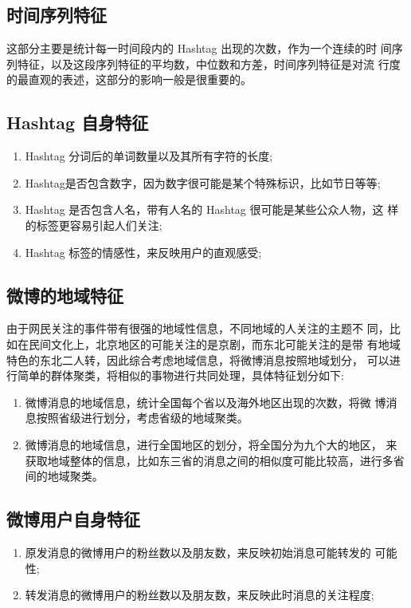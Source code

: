 \subsection{时间序列特征}

这部分主要是统计每一时间段内的 Hashtag 出现的次数，作为一个连续的时 间序列特征，以及这段序列特征的平均数，中位数和方差，时间序列特征是对流 行度的最直观的表述，这部分的影响一般是很重要的。

\subsection{Hashtag 自身特征}

\begin{enumerate}
\item Hashtag 分词后的单词数量以及其所有字符的长度;
\item Hashtag是否包含数字，因为数字很可能是某个特殊标识，比如节日等等; 
\item Hashtag 是否包含人名，带有人名的 Hashtag 很可能是某些公众人物，这
样的标签更容易引起人们关注;
\item Hashtag 标签的情感性，来反映用户的直观感受;
\end{enumerate}


\subsection{微博的地域特征}
由于网民关注的事件带有很强的地域性信息，不同地域的人关注的主题不 同，比如在民间文化上，北京地区的可能关注的是京剧，而东北可能关注的是带 有地域特色的东北二人转，因此综合考虑地域信息，将微博消息按照地域划分， 可以进行简单的群体聚类，将相似的事物进行共同处理，具体特征划分如下:
\begin{enumerate}
\item 微博消息的地域信息，统计全国每个省以及海外地区出现的次数，将微 博消息按照省级进行划分，考虑省级的地域聚类。
\item 微博消息的地域信息，进行全国地区的划分，将全国分为九个大的地区， 来获取地域整体的信息，比如东三省的消息之间的相似度可能比较高，进行多省 间的地域聚类。
\end{enumerate}


\subsection{微博用户自身特征}
\begin{enumerate}
\item 原发消息的微博用户的粉丝数以及朋友数，来反映初始消息可能转发的 可能性;
\item 转发消息的微博用户的粉丝数以及朋友数，来反映此时消息的关注程度;
\end{enumerate}



